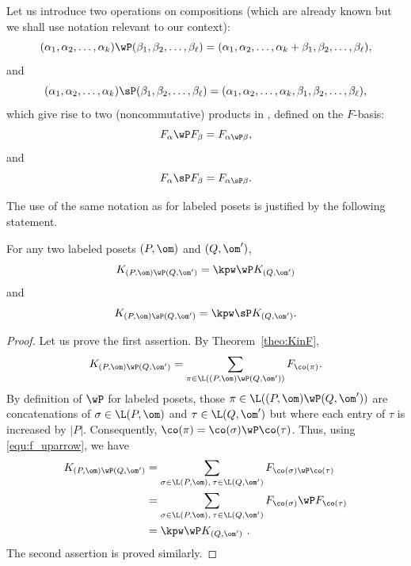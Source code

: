 Let us introduce two operations on compositions 
(which are already known but we shall use notation relevant to our context):
\begin{equation}\label{equ:uparrow}
(\alpha_1,\alpha_2,\dots,\alpha_k) \wP (\beta_1,\beta_2,\dots,\beta_\ell)
=
(\alpha_1,\alpha_2,\dots,\alpha_k+\beta_1,\beta_2,\dots,\beta_\ell),
\end{equation}
and
\begin{equation}\label{equ:upuparrow}
(\alpha_1,\alpha_2,\dots,\alpha_k) \sP (\beta_1,\beta_2,\dots,\beta_\ell)
=
(\alpha_1,\alpha_2,\dots,\alpha_k,\beta_1,\beta_2,\dots,\beta_\ell),
\end{equation}
which give rise to two (noncommutative) products in \qsym, defined on the $F$-basis:
\begin{equation}\label{equ:f_uparrow}
F_{\alpha} \wP F_{\beta}
=
F_{\alpha \wP \beta},
\end{equation}
and
\begin{equation}\label{equ:f_upuparrow}
F_{\alpha} \sP F_{\beta}
=
F_{\alpha \sP \beta}.
\end{equation}

The use of the same notation as for labeled posets is justified by the following statement.
\begin{proposition}\label{prop:k_products}
For any two labeled posets $(P,\om)$ and $(Q,\om')$, 
$$K_{(P,\om)\wP(Q,\om')}=\kpw \wP K_{(Q,\om')}$$
and
$$K_{(P,\om)\sP(Q,\om')}=\kpw \sP K_{(Q,\om')}.$$
\end{proposition}
\begin{proof}
Let us prove the first assertion.
By Theorem~\ref{theo:KinF}, 
\[
K_{(P,\om) \wP (Q,\om')} = \sum_{\pi\in\L((P,\om)\wP (Q,\om'))} F_{\co(\pi)}.
\]
By definition of $\wP$ for labeled posets, those $\pi\in\L((P,\om)\wP (Q,\om'))$ are concatenations of $\sigma\in\L(P,\om)$ and $\tau\in\L(Q,\om')$ but where each entry of $\tau$ is increased by $|P|$.   Consequently, $\co(\pi) = \co(\sigma)\wP \co(\tau)$. Thus, using \eqref{equ:f_uparrow}, we have 
\begin{align*}
K_{(P,\om) \wP (Q,\om')} 
&= \sum_{\sigma\in\L(P,\om),\:\tau\in\L(Q,\om')} F_{\co(\sigma)\wP \co(\tau)}\\
&= \sum_{\sigma\in\L(P,\om),\:\tau\in\L(Q,\om')} F_{\co(\sigma)}\wP F_{\co(\tau)}\\
&= \kpw \wP K_{(Q,\om')}\ .
\end{align*}
The second assertion is proved similarly.
\end{proof}

